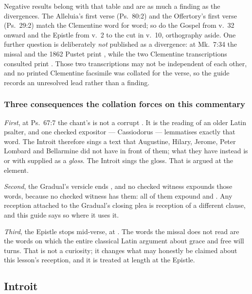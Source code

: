 Negative results belong with that table and are as much a finding as the
divergences. The Alleluia's first verse (Ps.~80:2) and the Offertory's first
verse (Ps.~29:2) match the Clementine word for word; so do the Gospel from
v.~32 onward and the Epistle from v.~2 to the cut in v.~10, orthography aside.
One further question is deliberately \textit{not} published as a divergence: at
Mk.~7:34 the missal and the 1862 Pustet print ,
while the two Clementine transcriptions consulted print .
Those two transcriptions may not be independent of each other, and no printed
Clementine facsimile was collated for the verse, so the guide records an
unresolved lead rather than a finding.

\subsubsection*{Three consequences the collation forces on this commentary}

\textit{First}, at Ps.~67:7 the chant's  is not a corrupt
. It is the reading of an older Latin psalter, and one
checked expositor --- Cassiodorus --- lemmatises exactly that word. The Introit
therefore sings a text that Augustine, Hilary, Jerome, Peter Lombard and
Bellarmine did not have in front of them; what they have instead is
 or  with  supplied as a
\textit{gloss}. The Introit sings the gloss. That is argued at the element.

\textit{Second}, the Gradual's versicle ends , and no
checked witness expounds those words, because no checked witness has them: all
of them expound  and . Any reception
attached to the Gradual's closing plea is reception of a different clause, and
this guide says so where it uses it.

\textit{Third}, the Epistle stops mid-verse, at . The words the missal does not read are the words on which the
entire classical Latin argument about grace and free will turns. That is not a
curiosity; it changes what may honestly be claimed about this lesson's
reception, and it is treated at length at the Epistle.

\elementguard
\subsection*{Introit }

